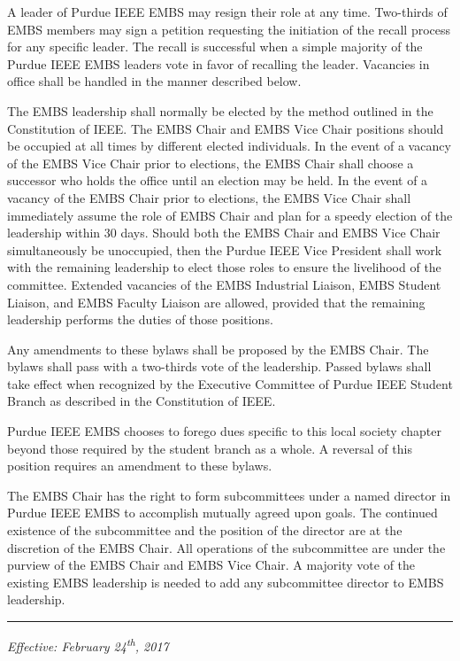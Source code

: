 \documentclass[12pt]{constitution}
\begin{document}
A leader of Purdue IEEE EMBS may resign their role at any time. Two-thirds of EMBS members may sign a petition requesting the initiation of the recall process for any specific leader. The recall is successful when a simple majority of the Purdue IEEE EMBS leaders vote in favor of recalling the leader. Vacancies in office shall be handled in the manner described below.

The EMBS leadership shall normally be elected by the method outlined in the Constitution of IEEE. The EMBS Chair and EMBS Vice Chair positions should be occupied at all times by different elected individuals. In the event of a vacancy of the EMBS Vice Chair prior to elections, the EMBS Chair shall choose a successor who holds the office until an election may be held. In the event of a vacancy of the EMBS Chair prior to elections, the EMBS Vice Chair shall immediately assume the role of EMBS Chair and plan for a speedy election of the leadership within 30 days. Should both the EMBS Chair and EMBS Vice Chair simultaneously be unoccupied, then the Purdue IEEE Vice President shall work with the remaining leadership to elect those roles to ensure the livelihood of the committee. Extended vacancies of the EMBS Industrial Liaison, EMBS Student Liaison, and EMBS Faculty Liaison are allowed, provided that the remaining leadership performs the duties of those positions.


\label{art:amend}

Any amendments to these bylaws shall be proposed by the EMBS Chair. The bylaws shall pass with a two-thirds vote of the leadership. Passed bylaws shall take effect when recognized by the Executive Committee of Purdue IEEE Student Branch as described in the Constitution of IEEE.


\label{art:dues}

Purdue IEEE EMBS chooses to forego dues specific to this local society chapter beyond those required by the student branch as a whole. A reversal of this position requires an amendment to these bylaws.


\label{art:subcommittee}

The EMBS Chair has the right to form subcommittees under a named director in Purdue IEEE EMBS to accomplish mutually agreed upon goals. The continued existence of the subcommittee and the position of the director are at the discretion of the EMBS Chair. All operations of the subcommittee are under the purview of the EMBS Chair and EMBS Vice Chair. A majority vote of the existing EMBS leadership is needed to add any subcommittee director to EMBS leadership.



\vspace{12pt}
\hrule

\textit{Effective: February 24\textsuperscript{th}, 2017}


\setcounter{tocdepth}{1}
\listoftodos %
\end{document}
